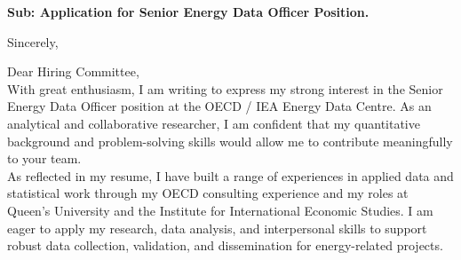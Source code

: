 \documentclass[11pt,a4paper,roman]{moderncv}
\begin{document}
\date{\today}
\opening{\textbf{Sub: Application for Senior Energy Data Officer Position.}}
\closing{Sincerely, \vspace{-1em}}


\makelettertitle



Dear Hiring Committee,
\\
\vspace{1em}
With great enthusiasm, I am writing to express my strong interest in the Senior Energy Data Officer position at the OECD / IEA Energy Data Centre. As an analytical and collaborative researcher, I am confident that my quantitative background and problem-solving skills would allow me to contribute meaningfully to your team.\\

\vspace{1em}
As reflected in my resume, I have built a range of experiences in applied data and statistical work through my OECD consulting experience and my roles at Queen's University and the Institute for International Economic Studies. I am eager to apply my research, data analysis, and interpersonal skills to support robust data collection, validation, and dissemination for energy-related projects.\\
\vspace{1em}
\end{document}
